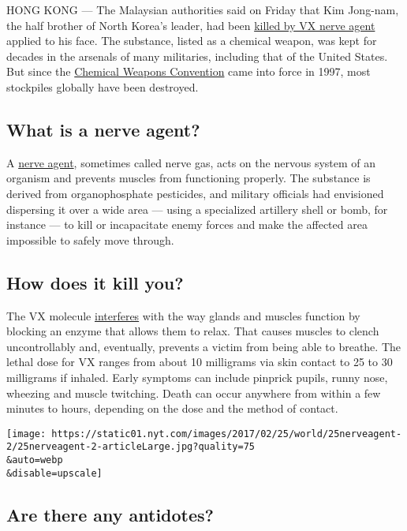 HONG KONG --- The Malaysian authorities said on Friday that Kim
Jong-nam, the half brother of North Korea's leader, had been
\href{https://www.nytimes.com/2017/02/23/world/asia/kim-jong-nam-vx-nerve-agent-.html}{killed
by VX nerve agent} applied to his face. The substance, listed as a
chemical weapon, was kept for decades in the arsenals of many
militaries, including that of the United States. But since the
\href{https://www.opcw.org/chemical-weapons-convention/}{Chemical
Weapons Convention} came into force in 1997, most stockpiles globally
have been destroyed.

\hypertarget{what-is-a-nerve-agent}{%
\subsection{What is a nerve agent?}\label{what-is-a-nerve-agent}}

A \href{https://fas.org/programs/bio/chemweapons/cwagents.html}{nerve
agent}, sometimes called nerve gas, acts on the nervous system of an
organism and prevents muscles from functioning properly. The substance
is derived from organophosphate pesticides, and military officials had
envisioned dispersing it over a wide area --- using a specialized
artillery shell or bomb, for instance --- to kill or incapacitate enemy
forces and make the affected area impossible to safely move through.

\hypertarget{how-does-it-kill-you}{%
\subsection{How does it kill you?}\label{how-does-it-kill-you}}

The VX molecule
\href{https://emergency.cdc.gov/agent/vx/basics/facts.asp}{interferes}
with the way glands and muscles function by blocking an enzyme that
allows them to relax. That causes muscles to clench uncontrollably and,
eventually, prevents a victim from being able to breathe. The lethal
dose for VX ranges from about 10 milligrams via skin contact to 25 to 30
milligrams if inhaled. Early symptoms can include pinprick pupils, runny
nose, wheezing and muscle twitching. Death can occur anywhere from
within a few minutes to hours, depending on the dose and the method of
contact.

\texttt{[image: https://static01.nyt.com/images/2017/02/25/world/25nerveagent-2/25nerveagent-2-articleLarge.jpg?quality=75\\\&auto=webp\\\&disable=upscale]}

\hypertarget{are-there-any-antidotes}{%
\subsection{Are there any antidotes?}\label{are-there-any-antidotes}}

